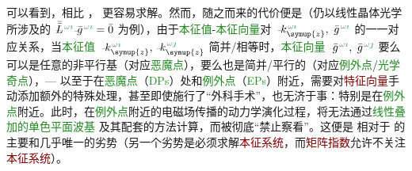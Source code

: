 可以看到，相比 ，  更容易求解。然而，随之而来的代价便是（仍以线性晶体光学所涉及的 $\Xint{\mathcolor{gray}{-}}{32}{\bar{\bar{L}}}^{\;\! \mathcolor{gray}{\omega} \textcolor{ForestGreen}{\imath}} \Xint{{}^{}_{\mathcolor{gray}{-}}}{10}{\bar{g}}^{\;\!\mathcolor{gray}{\omega} \textcolor{ForestGreen}{\imath}} = \bar{0}$ 为例），由于\textcolor{ForestGreen}{本征值}-\textcolor{ForestGreen}{本征向量}对 $\Xint{\begin{smallmatrix} ~ \\ {}^{}_{\mathcolor{gray}{-}} \\ ~ \end{smallmatrix}}{15}{k}_{\symup{z}}^{\;\! \mathcolor{gray}{\omega} \textcolor{ForestGreen}{\imath}}, \Xint{{}^{}_{\mathcolor{gray}{-}}}{10}{\bar{g}}^{\;\!\mathcolor{gray}{\omega} \textcolor{ForestGreen}{\imath}}$ 的一一对应关系，当\textcolor{ForestGreen}{本征值} $\Xint{\begin{smallmatrix} ~ \\ {}^{}_{\mathcolor{gray}{-}} \\ ~ \end{smallmatrix}}{15}{k}_{\symup{z}}^{\;\! \mathcolor{gray}{\omega} \textcolor{ForestGreen}{\imath}}, \Xint{\begin{smallmatrix} ~ \\ {}^{}_{\mathcolor{gray}{-}} \\ ~ \end{smallmatrix}}{15}{k}_{\symup{z}}^{\;\! \mathcolor{gray}{\omega} \textcolor{ForestGreen}{\jmath}}$ 简并/相等时，\textcolor{ForestGreen}{本征向量} $\Xint{{}^{}_{\mathcolor{gray}{-}}}{10}{\bar{g}}^{\;\!\mathcolor{gray}{\omega} \textcolor{ForestGreen}{\imath}}, \Xint{{}^{}_{\mathcolor{gray}{-}}}{10}{\bar{g}}^{\;\!\mathcolor{gray}{\omega} \textcolor{ForestGreen}{\jmath}}$ 要么可以是任意的非平行基（对应\textcolor{ForestGreen}{恶魔点}），要么也是简并/平行的（对应\textcolor{ForestGreen}{例外点}/\textcolor{ForestGreen}{光学奇点}），--- 以至于在\textcolor{ForestGreen}{恶魔点}（\textcolor{ForestGreen}{DPs}）处和\textcolor{ForestGreen}{例外点}（\textcolor{ForestGreen}{EPs}）附近，需要对\textcolor{Maroon}{特征向量}手动添加额外的特殊处理，甚至即使施行了“外科手术”，也无济于事：特别是在\textcolor{ForestGreen}{例外点}附近。此时，在\textcolor{ForestGreen}{例外点}附近的电磁场传播的动力学演化过程，将无法通过\textcolor{ForestGreen}{线性叠加的单色平面波基}  及其配套的方法计算，而被彻底“禁止察看”。这便是  相对于  的主要和几乎唯一的劣势（另一个劣势是必须求解\textcolor{Maroon}{本征系统}，而\textcolor{Maroon}{矩阵指数}允许不关注\textcolor{Maroon}{本征系统}\cite{zarifiPlaneWaveReflection2014}）。

